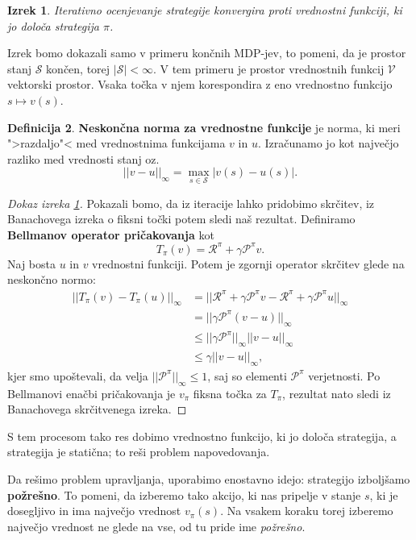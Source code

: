 \documentclass[12pt,a4paper]{amsart}
\theoremstyle{definition} %
\newtheorem{definicija}{Definicija}[section]
\theoremstyle{plain} %
\newtheorem{izrek}[definicija]{Izrek}
\begin{document}
\begin{izrek}\label{ios}
    Iterativno ocenjevanje strategije konvergira proti vrednostni funkciji, ki jo določa strategija 
    $\pi$.
\end{izrek}

Izrek bomo dokazali samo v primeru končnih MDP-jev, to pomeni, da je prostor stanj $\mathcal{S}$ 
končen, torej $|\mathcal{S}| < \infty$. V tem primeru je prostor vrednostnih funkcij $\mathcal{V}$
vektorski prostor. Vsaka točka v njem korespondira z eno vrednostno funkcijo $s \mapsto v(s)$.

\begin{definicija}
    \textbf{Neskončna norma za vrednostne funkcije} je norma, ki meri ">razdaljo"< med vrednostnima 
    funkcijama $v$ in $u$. Izračunamo jo kot največjo razliko med vrednosti stanj oz. 
    $$
    ||v - u||_\infty = \max_{s \in \mathcal{S}} |v(s) - u(s)|.
    $$
\end{definicija}

\begin{proof}[Dokaz izreka \ref{ios}]
    Pokazali bomo, da iz iteracije lahko pridobimo skrčitev, iz Banachovega izreka o fiksni točki 
    potem sledi naš rezultat.
    Definiramo \textbf{Bellmanov operator pričakovanja} kot 
    $$
    T_\pi(v) = \mathcal{R}^\pi + \gamma \mathcal{P}^\pi v.
    $$
    Naj bosta $u$ in $v$ vrednostni funkciji. Potem je zgornji operator skrčitev glede na neskončno 
    normo: 
    \begin{align*}
        ||T_\pi(v) - T_\pi(u)||_\infty &= ||\mathcal{R}^\pi + \gamma \mathcal{P}^\pi v - 
                                            \mathcal{R}^\pi + \gamma \mathcal{P}^\pi u||_\infty \\  
        &= ||\gamma \mathcal{P}^\pi (v - u)||_\infty \\
        &\leq ||\gamma \mathcal{P}^\pi||_\infty ||v - u||_\infty \\
        &\leq \gamma ||v - u||_\infty,
    \end{align*}
    kjer smo upoštevali, da velja $||\mathcal{P}^\pi||_\infty \leq 1$, saj so elementi 
    $\mathcal{P}^\pi$ verjetnosti. Po Bellmanovi enačbi pričakovanja je $v_\pi$ fiksna točka 
    za $T_\pi$, rezultat nato sledi iz Banachovega skrčitvenega izreka.
\end{proof}

S tem procesom tako res dobimo vrednostno funkcijo, ki jo določa strategija, a strategija je 
statična; to reši problem napovedovanja. 

Da rešimo problem upravljanja, uporabimo enostavno idejo: strategijo izboljšamo \textbf{požrešno}. 
To pomeni, da izberemo tako akcijo, ki nas pripelje v stanje $s$, ki je dosegljivo in ima največjo 
vrednost $v_\pi(s)$. Na vsakem koraku torej izberemo največjo vrednost ne glede na vse, od tu pride 
ime \textit{požrešno}.
\end{document}
